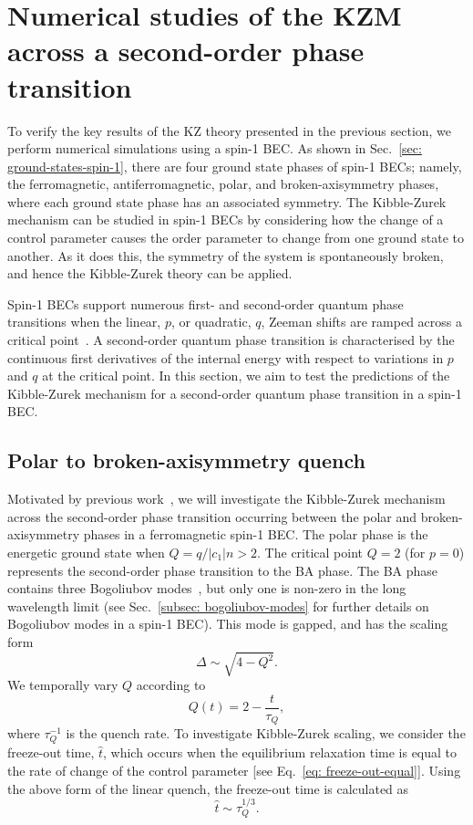 \section{Numerical studies of the KZM across a second-order phase transition}
To verify the key results of the KZ theory presented in the previous section,
we perform numerical simulations using a spin-1 BEC\@.
As shown in Sec.~\ref{sec: ground-states-spin-1}, there are four ground state
phases of spin-1 BECs; namely, the ferromagnetic, antiferromagnetic, polar, and
broken-axisymmetry phases, where each ground state phase has an associated
symmetry.
The Kibble-Zurek mechanism can be studied in spin-1 BECs by considering how
the change of a control parameter causes the order parameter to change from
one ground state to another.
As it does this, the symmetry of the system is spontaneously broken, and hence
the Kibble-Zurek theory can be applied.

Spin-1 BECs support numerous first- and second-order quantum phase transitions
when the linear, \( p \), or quadratic, \( q \), Zeeman shifts are
ramped across a critical point~\cite{Kawaguchi2012}.
A second-order quantum phase transition is characterised by the continuous first
derivatives of the internal energy with respect to variations in \( p \) and
\( q \) at the critical point.
In this section, we aim to test the predictions of the Kibble-Zurek mechanism
for a second-order quantum phase transition in a spin-1 BEC\@.

\subsection{Polar to broken-axisymmetry quench}\label{sec: KZM-second-order-numerics}
Motivated by previous work~\cite{Damski2007}, we will investigate the
Kibble-Zurek mechanism across the second-order phase transition occurring
between the polar and broken-axisymmetry phases in a ferromagnetic spin-1 BEC\@.
The polar phase is the energetic ground state when \( Q=q/|c_1|n > 2 \).
The critical point \( Q = 2 \) (for \(p=0\)) represents the second-order phase
transition to the BA phase.
The BA phase contains three Bogoliubov modes~\cite{Uchino2010}, but only one
is non-zero in the long wavelength limit (see
Sec.~\ref{subsec: bogoliubov-modes} for further details on Bogoliubov modes in
a spin-1 BEC).
This mode is gapped, and has the scaling form
\begin{equation}
    \Delta \sim \sqrt{4 - Q^2}.
\end{equation}
We temporally vary \(Q\) according to
\begin{equation}
    Q(t) = 2 - \frac{t}{\tau_Q},
    \label{eq: time-dep-Q-damski}
\end{equation}
where \( \tau_Q^{-1} \) is the quench rate.
To investigate Kibble-Zurek scaling, we consider the freeze-out time,
\( \hat{t} \), which occurs when the equilibrium relaxation time is equal to the
rate of change of the control parameter [see Eq.~\eqref{eq: freeze-out-equal}].
Using the above form of the linear quench, the freeze-out time is calculated
as~\cite{Damski2007}
\begin{equation}
    \hat{t} \sim \tau_Q^{1/3}.
\end{equation}


